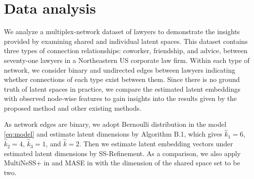 \documentclass[12pt]{article}
\begin{document}
\section{Data analysis} \label{sec:data}
We analyze a multiplex-network dataset of  lawyers \citep{lazega2001collegial} to demonstrate the insights provided by examining shared and individual latent spaces. 
This dataset contains three types of connection relationships:  coworker, friendship, and advice,   between seventy-one lawyers in a Northeastern US corporate law firm. 
Within each type of network, we consider binary and undirected edges between lawyers indicating whether 
connections of each type exist between them. 
Since there is no ground truth of latent spaces in practice, 
we compare the estimated latent embeddings with observed node-wise features to gain insights into the results given by the proposed method and other existing methods.   


As network edges are binary, 
we adopt Bernoulli distribution in the model \eqref{eq:model} and estimate latent dimensions by Algorithm B.1, which gives  $\hat{k}_1 = 6$, $\hat{k}_2 = 4$, $\hat{k}_3 = 1$, and $\hat{k}=2$. 
Then we estimate  latent embedding  vectors under estimated latent dimensions by SS-Refinement.  
As  a comparison, we also apply   MultiNeSS+ in  \cite{macdonald2022latent} and  MASE in \cite{arroyo2021inference}  with the dimension of the shared space set to be two.  

\end{document}
